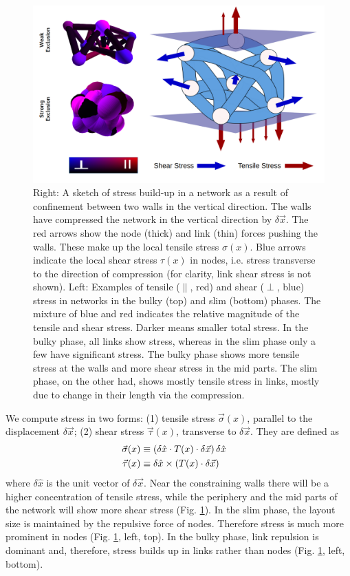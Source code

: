 \documentclass[nofootinbib,preprint,endfloats]{revtex4} %
\begin{document}
\begin{figure}
    \centering
    \includegraphics[width = .7\columnwidth]{fig-09-19/stress-ex.png}
    \caption{Right: A sketch of stress build-up in a network as a result of confinement between two walls in the vertical direction. 
    The walls have compressed the network in the vertical direction by $\delta \vec{x}$. 
    The red arrows show the node (thick) and link (thin) forces pushing the walls. 
    These make up the local tensile stress $\sigma(x)$. 
    Blue arrows indicate the local shear stress $\tau(x)$ in nodes, i.e. stress transverse to the direction of compression (for clarity, link shear stress is not shown).
    Left: Examples of tensile ($\parallel$, red) and shear ($\perp$, blue) stress in networks in the bulky (top) and slim (bottom) phases. 
    The mixture of blue and red indicates the relative magnitude of the tensile and shear stress. Darker means smaller total stress.  
    In the bulky phase, all links show stress, whereas in the slim phase only a few have significant stress. 
    The bulky phase shows more tensile stress at the walls and more shear stress in the mid parts. 
    The slim phase, on the other had, shows mostly tensile stress in links, mostly due to change in their length via the compression.  }
    \label{fig:stress}
\end{figure}
We compute stress in two forms: (1) tensile stress $\vec{\sigma}(x)$, parallel to the displacement $\delta \vec{x}$;  
(2) shear stress $\vec{\tau} (x)$, transverse to $\delta \vec{x}$. They are defined as
\begin{align}
    \vec{\sigma}(x)& \equiv \left(\delta \hat{x}\cdot T(x) \cdot \delta \vec{x}\right) \delta\hat{x} \cr
    \vec{\tau }(x)&\equiv \delta \hat{x}\times (T (x)\cdot \delta \vec{x})  
\end{align}
where $ \delta \hat{x}$ is the unit vector of $\delta \vec{x}$. Near the constraining walls there will be a higher concentration of tensile stress, while the periphery and the mid parts of the network will show more shear stress (Fig. \ref{fig:stress}). In the slim phase, the layout size is maintained by the repulsive force of nodes. Therefore stress is much more prominent in nodes (Fig. \ref{fig:stress}, left, top). In the bulky phase, link repulsion is dominant and, therefore, stress builds up in links rather than nodes (Fig. \ref{fig:stress}, left, bottom).
\end{document}
